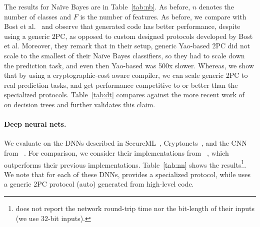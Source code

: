 
The results for Na\"{i}ve Bayes are
in Table~\ref{tab:nb}. As before, $n$ denotes the number of classes and $F$ is the number of features.
As before, we compare with Bost et al.~\cite{shafindss} and observe that \tool generated code
has better performance, despite using a generic 2PC,
as opposed to custom designed protocols developed by Bost et
al. Moreover, they remark that in their setup, generic Yao-based 2PC
did not scale to the smallest of their Na\"{i}ve Bayes classifiers, so
they had to scale down the prediction task, and even then Yao-based \mpc
was 500x slower. Whereas, we show that by using a
cryptographic-cost aware compiler, we can scale generic 2PC to real
prediction tasks, and get performance competitive to or better than the
specialized protocols. Table~\ref{tab:dt} 
compares against the more recent work of~\cite{wu}
on decision trees and further validates this claim.

\paragraph{Deep neural nets.}
We evaluate \tool on the DNNs described in SecureML~\cite{secureml},
Cryptonets~\cite{cryptonets}, and the CNN from \minion~\cite{minionn}. For
comparison, we consider their implementations from
\minion~\cite{minionn}, which outperforms their previous
implementations. Table~\ref{tab:nn} shows the
results\footnote{\minion does not report the network round-trip time nor the bit-length of their inputs (we use $32$-bit inputs).}.
We note that for each of these DNNs, \minion provides a
specialized protocol, while \tool uses a generic 2PC protocol
(auto) generated from high-level code.

